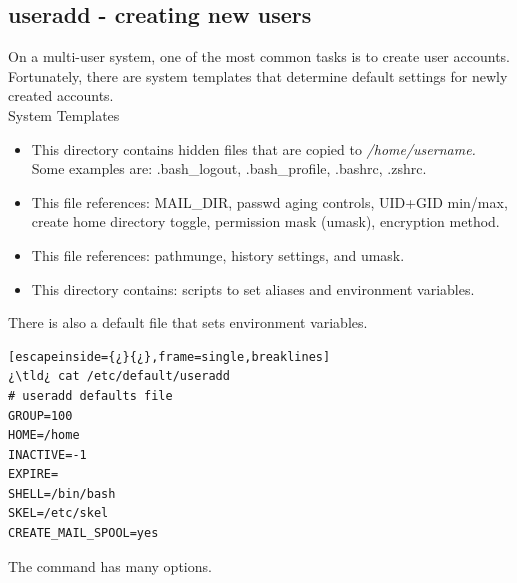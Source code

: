 \subsection{useradd - creating new users}

On a multi-user system, one of the most common tasks is to create user accounts. Fortunately, there are system templates that determine default settings for newly created accounts.\\

System Templates
\begin{itemize}
		\item {} This directory contains hidden files that are copied to \textsl{/home/username.} Some examples are: .bash\_logout, .bash\_profile, .bashrc, .zshrc.
	\item {} This file references: MAIL\_DIR, passwd aging controls, UID+GID min/max, create home directory toggle, permission mask (umask), encryption method.
	\item {} This file references: pathmunge, history settings, and umask.
	\item {} This directory contains: scripts to set aliases and environment variables.
\end{itemize}

There is also a  default file that sets environment variables.

\begin{lstlisting}[escapeinside={¿}{¿},frame=single,breaklines]
¿\tld¿ cat /etc/default/useradd
# useradd defaults file
GROUP=100
HOME=/home
INACTIVE=-1
EXPIRE=
SHELL=/bin/bash
SKEL=/etc/skel
CREATE_MAIL_SPOOL=yes
\end{lstlisting}	

The  command has many options. 

